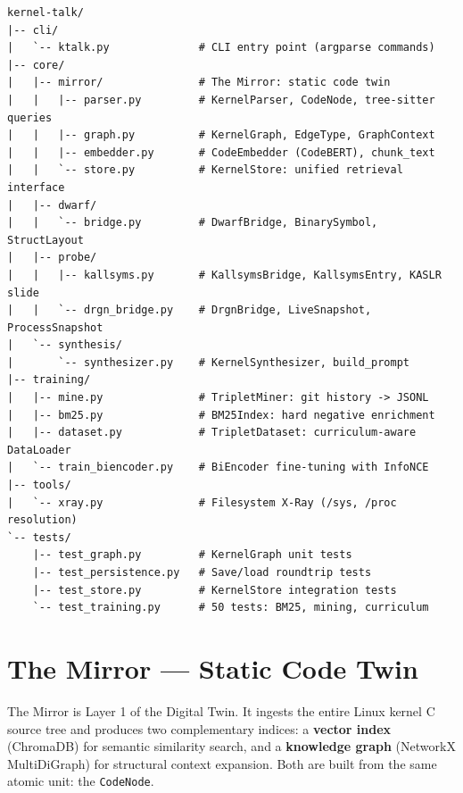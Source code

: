\documentclass[11pt,a4paper]{article}
\newcommand{\coderef}[1]{\texttt{\small\color{layer2}#1}}
\begin{document}
\begin{tcolorbox}[
  colback=codebg, colframe=darkgrey!30, arc=4pt,
  title={\small\ttfamily kernel-talk/ --- top-level layout},
  fonttitle=\bfseries\small
]
\begin{lstlisting}[language={}, numbers=none, frame=none,
                   backgroundcolor=\color{codebg}, basicstyle=\ttfamily\small]
kernel-talk/
|-- cli/
|   `-- ktalk.py              # CLI entry point (argparse commands)
|-- core/
|   |-- mirror/               # The Mirror: static code twin
|   |   |-- parser.py         # KernelParser, CodeNode, tree-sitter queries
|   |   |-- graph.py          # KernelGraph, EdgeType, GraphContext
|   |   |-- embedder.py       # CodeEmbedder (CodeBERT), chunk_text
|   |   `-- store.py          # KernelStore: unified retrieval interface
|   |-- dwarf/
|   |   `-- bridge.py         # DwarfBridge, BinarySymbol, StructLayout
|   |-- probe/
|   |   |-- kallsyms.py       # KallsymsBridge, KallsymsEntry, KASLR slide
|   |   `-- drgn_bridge.py    # DrgnBridge, LiveSnapshot, ProcessSnapshot
|   `-- synthesis/
|       `-- synthesizer.py    # KernelSynthesizer, build_prompt
|-- training/
|   |-- mine.py               # TripletMiner: git history -> JSONL
|   |-- bm25.py               # BM25Index: hard negative enrichment
|   |-- dataset.py            # TripletDataset: curriculum-aware DataLoader
|   `-- train_biencoder.py    # BiEncoder fine-tuning with InfoNCE
|-- tools/
|   `-- xray.py               # Filesystem X-Ray (/sys, /proc resolution)
`-- tests/
    |-- test_graph.py         # KernelGraph unit tests
    |-- test_persistence.py   # Save/load roundtrip tests
    |-- test_store.py         # KernelStore integration tests
    `-- test_training.py      # 50 tests: BM25, mining, curriculum
\end{lstlisting}
\end{tcolorbox}

\section{The Mirror --- Static Code Twin}
\label{sec:mirror}

The Mirror is Layer 1 of the Digital Twin. It ingests the entire Linux kernel
C source tree and produces two complementary indices: a \textbf{vector index}
(ChromaDB) for semantic similarity search, and a \textbf{knowledge graph}
(NetworkX MultiDiGraph) for structural context expansion. Both are built from
the same atomic unit: the \coderef{CodeNode}.
\end{document}
